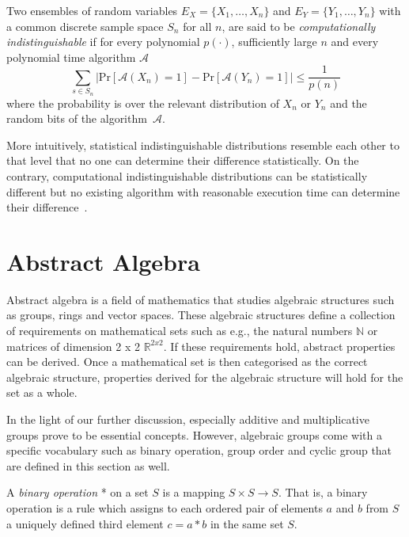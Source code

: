 \begin{defn}
\label{def:computational_indistinguishability}
 Two ensembles of random variables $E_X = \{ X_1, \ldots , X_n \}$ and $E_Y = \{ Y_1, \ldots , Y_n \}$ with a common discrete sample space $S_n$ for all $n$, are said to be \textit{computationally indistinguishable} if for every polynomial $p \left( \cdot \right)$, sufficiently large $n$ and every polynomial time algorithm $\mathcal{A}$
 \begin{equation*}
  \sum_{s \in S_n} \lvert \textrm{Pr} \left[ \mathcal{A} \left( X_n \right) = 1 \right] - \textrm{Pr} \left[ \mathcal{A} \left( Y_n \right) = 1 \right] \rvert \leq \frac{1}{p \left( n \right)}
 \end{equation*}
 where the probability is over the relevant distribution of $X_n$ or $Y_n$ and the random bits of the algorithm~$\mathcal{A}$.~\cite{book:Goldreich2001}
\end{defn}

More intuitively, statistical indistinguishable distributions resemble each other to that level that no one can determine their difference statistically.  On the contrary, computational indistinguishable distributions can be statistically different but no existing algorithm with reasonable execution time can determine their difference~\cite{art:KurosawaW92}.

\section{Abstract Algebra}
Abstract algebra is a field of mathematics that studies algebraic structures such as groups, rings and vector spaces. These algebraic structures define a collection of requirements on mathematical sets such as e.g., the natural numbers $\mathbb{N}$ or matrices of dimension 2 x 2 $\mathbb{R}^{2 x 2}$. If these requirements hold, abstract properties can be derived. Once a mathematical set is then categorised as the correct algebraic structure, properties derived for the algebraic structure will hold for the set as a whole.

In the light of our further discussion, especially additive and multiplicative groups prove to be essential concepts. However, algebraic groups come with a specific vocabulary such as binary operation, group order and cyclic group that are defined in this section as well.

\begin{defn}
 A \textit{binary operation} * on a set $S$ is a mapping $S \times S \rightarrow S$. That is, a binary operation is a rule which assigns to each ordered pair of elements $a$ and $b$ from $S$ a uniquely defined third element $c = a*b$ in the same set $S$.~\cite{book:survey_of_modern_algebra,book:handbook_of_applied_cryptography}
\end{defn}

